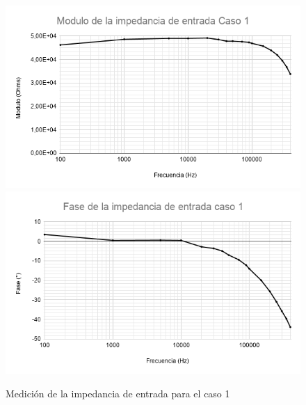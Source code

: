 \begin{figure}[H]
\begin{centering}
\includegraphics[scale=0.4]{../Ex1/ib/Resources1b/zinp1_m_med}\includegraphics[scale=0.4]{../Ex1/ib/Resources1b/zinp1_p_med}
\par\end{centering}
\caption{Medición de la impedancia de entrada para el caso 1}

\end{figure}

